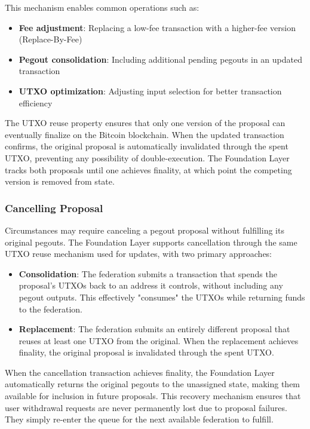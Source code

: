 This mechanism enables common operations such as:

\begin{itemize}
    \item \textbf{Fee adjustment}: Replacing a low-fee transaction with a higher-fee version (Replace-By-Fee)
    \item \textbf{Pegout consolidation}: Including additional pending pegouts in an updated transaction
    \item \textbf{UTXO optimization}: Adjusting input selection for better transaction efficiency
\end{itemize}

The UTXO reuse property ensures that only one version of the proposal can eventually finalize on the Bitcoin blockchain. When the updated transaction confirms, the original proposal is automatically invalidated through the spent UTXO, preventing any possibility of double-execution. The Foundation Layer tracks both proposals until one achieves finality, at which point the competing version is removed from state.

\subsubsection{Cancelling Proposal}
\label{sec:pegout-proposal-cancellation}

Circumstances may require canceling a pegout proposal without fulfilling its original pegouts. The Foundation Layer supports cancellation through the same UTXO reuse mechanism used for updates, with two primary approaches:

\begin{itemize}
    \item \textbf{Consolidation}: The federation submits a transaction that spends the proposal's UTXOs back to an address it controls, without including any pegout outputs. This effectively "consumes" the UTXOs while returning funds to the federation.

    \item \textbf{Replacement}: The federation submits an entirely different proposal that reuses at least one UTXO from the original. When the replacement achieves finality, the original proposal is invalidated through the spent UTXO.
\end{itemize}

When the cancellation transaction achieves finality, the Foundation Layer automatically returns the original pegouts to the unassigned state, making them available for inclusion in future proposals. This recovery mechanism ensures that user withdrawal requests are never permanently lost due to proposal failures. They simply re-enter the queue for the next available federation to fulfill.


